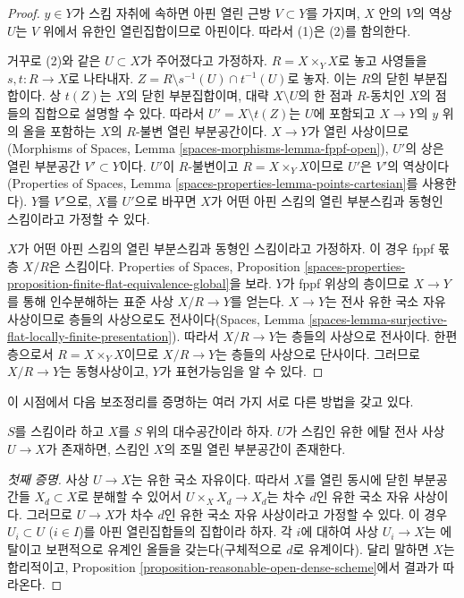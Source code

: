 \begin{proof}
$y \in Y$가 스킴 자취에 속하면 아핀 열린 근방 $V \subset Y$를
가지며, $X$ 안의 $V$의 역상 $U$는 $V$ 위에서 유한인 열린집합이므로
아핀이다. 따라서 (1)은 (2)를 함의한다.

\medskip\noindent
거꾸로 (2)와 같은 $U \subset X$가 주어졌다고 가정하자.
$R = X \times_Y X$로 놓고 사영들을 $s, t : R \to X$로 나타내자.
$Z = R \setminus s^{-1}(U) \cap t^{-1}(U)$로 놓자.
이는 $R$의 닫힌 부분집합이다. 상 $t(Z)$는 $X$의
닫힌 부분집합이며, 대략 $X \setminus U$의 한 점과 $R$-동치인
$X$의 점들의 집합으로 설명할 수 있다. 따라서
$U' = X \setminus t(Z)$는 $U$에 포함되고 $X \to Y$의 $y$ 위의
올을 포함하는 $X$의 $R$-불변 열린 부분공간이다.
$X \to Y$가 열린 사상이므로(Morphisms of Spaces, Lemma
\ref{spaces-morphisms-lemma-fppf-open}), $U'$의 상은 열린 부분공간
$V' \subset Y$이다. $U'$이 $R$-불변이고
$R = X \times_Y X$이므로 $U'$은 $V'$의 역상이다(Properties of
Spaces, Lemma \ref{spaces-properties-lemma-points-cartesian}를
사용한다). $Y$를 $V'$으로, $X$를 $U'$으로 바꾸면
$X$가 어떤 아핀 스킴의 열린 부분스킴과 동형인 스킴이라고 가정할
수 있다.

\medskip\noindent
$X$가 어떤 아핀 스킴의 열린 부분스킴과 동형인 스킴이라고 가정하자.
이 경우 fppf 몫층 $X/R$은 스킴이다. Properties of Spaces,
Proposition
\ref{spaces-properties-proposition-finite-flat-equivalence-global}을
보라. $Y$가 fppf 위상의 층이므로 $X \to Y$를 통해 인수분해하는
표준 사상 $X/R \to Y$를 얻는다. $X \to Y$는 전사 유한 국소 자유
사상이므로 층들의 사상으로도 전사이다(Spaces, Lemma
\ref{spaces-lemma-surjective-flat-locally-finite-presentation}).
따라서 $X/R \to Y$는 층들의 사상으로 전사이다.
한편 층으로서 $R = X \times_Y X$이므로 $X/R \to Y$는 층들의
사상으로 단사이다. 그러므로 $X/R \to Y$는 동형사상이고,
$Y$가 표현가능임을 알 수 있다.
\end{proof}

\noindent
이 시점에서 다음 보조정리를 증명하는 여러 가지 서로 다른 방법을
갖고 있다.

\begin{lemma}
\label{lemma-finite-etale-cover-dense-open-scheme}
$S$를 스킴이라 하고 $X$를 $S$ 위의 대수공간이라 하자.
$U$가 스킴인 유한 에탈 전사 사상 $U \to X$가 존재하면,
스킴인 $X$의 조밀 열린 부분공간이 존재한다.
\end{lemma}

\begin{proof}[첫째 증명]
사상 $U \to X$는 유한 국소 자유이다. 따라서 $X$를 열린 동시에
닫힌 부분공간들 $X_d \subset X$로 분해할 수 있어서
$U \times_X X_d \to X_d$는 차수 $d$인 유한 국소 자유 사상이다.
그러므로 $U \to X$가 차수 $d$인 유한 국소 자유 사상이라고
가정할 수 있다. 이 경우 $U_i \subset U$ ($i \in I$)를 아핀
열린집합들의 집합이라 하자. 각 $i$에 대하여 사상 $U_i \to X$는
에탈이고 보편적으로 유계인 올들을 갖는다(구체적으로 $d$로 유계이다).
달리 말하면 $X$는 합리적이고, Proposition
\ref{proposition-reasonable-open-dense-scheme}에서 결과가 따라온다.
\end{proof}


